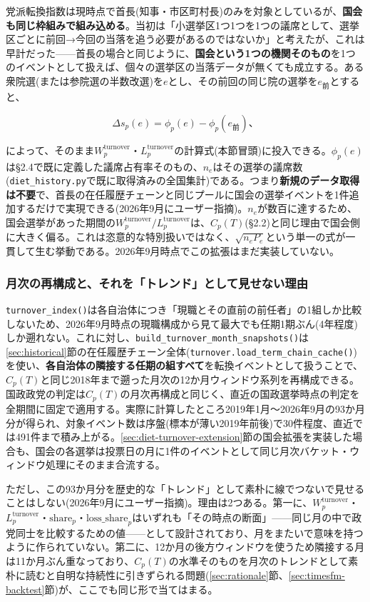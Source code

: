 \documentclass[a4paper,11pt]{ltjsarticle}
\begin{document}
党派転換指数は現時点で首長(知事・市区町村長)のみを対象としているが、\textbf{国会も同じ枠組みで組み込める}。当初は「小選挙区1つ1つを1つの議席として、選挙区ごとに前回→今回の当落を追う必要があるのではないか」と考えたが、これは早計だった——首長の場合と同じように、\textbf{国会という1つの機関そのもの}を1つのイベントとして扱えば、個々の選挙区の当落データが無くても成立する。ある衆院選(または参院選の半数改選)を$e$とし、その前回の同じ院の選挙を$e_{前}$とすると、

\[
\Delta s_p(e) = \phi_p(e) - \phi_p(e_{前})、
\]

によって、そのまま$W_p^{\text{turnover}}$・$L_p^{\text{turnover}}$の計算式(本節冒頭)に投入できる。$\phi_p(e)$は\S2.4で既に定義した議席占有率そのもの、$n_e$はその選挙の議席数(\texttt{diet\_history.py}で既に取得済みの全国集計)である。つまり\textbf{新規のデータ取得は不要}で、首長の在任履歴チェーンと同じプールに国会の選挙イベントを1件追加するだけで実現できる(2026年9月にユーザー指摘)。$n_e$が数百に達するため、国会選挙があった期間の$W_p^{\text{turnover}}/L_p^{\text{turnover}}$は、$C_p(T)$(\S2.2)と同じ理由で国会側に大きく偏る。これは恣意的な特別扱いではなく、$\sqrt{n_eP_e}$という単一の式が一貫して生む挙動である。2026年9月時点でこの拡張はまだ実装していない。

\subsubsection{月次の再構成と、それを「トレンド」として見せない理由}

\texttt{turnover\_index()}は各自治体につき「現職とその直前の前任者」の1組しか比較しないため、2026年9月時点の現職構成から見て最大でも任期1期ぶん(4年程度)しか遡れない。これに対し、\texttt{build\_turnover\_month\_snapshots()}は\ref{sec:historical}節の在任履歴チェーン全体(\texttt{turnover.load\_term\_chain\_cache()})を使い、\textbf{各自治体の隣接する任期の組すべて}を転換イベントとして扱うことで、$C_p(T)$と同じ2018年まで遡った月次の12か月ウィンドウ系列を再構成できる。国政政党の判定は$C_p(T)$の月次再構成と同じく、直近の国政選挙時点の判定を全期間に固定で適用する。実際に計算したところ2019年1月〜2026年9月の93か月分が得られ、対象イベント数は序盤(標本が薄い2019年前後)で30件程度、直近では491件まで積み上がる。\ref{sec:diet-turnover-extension}節の国会拡張を実装した場合も、国会の各選挙は投票日の月に1件のイベントとして同じ月次バケット・ウィンドウ処理にそのまま合流する。

ただし、この93か月分を歴史的な「トレンド」として素朴に線でつないで見せることはしない(2026年9月にユーザー指摘)。理由は2つある。第一に、$W_p^{\text{turnover}}$・$L_p^{\text{turnover}}$・$\text{share}_p$・$\text{loss\_share}_p$はいずれも「その時点の断面」——同じ月の中で政党同士を比較するための値——として設計されており、月をまたいで意味を持つように作られていない。第二に、12か月の後方ウィンドウを使うため隣接する月は11か月ぶん重なっており、$C_p(T)$の水準そのものを月次のトレンドとして素朴に読むと自明な持続性に引きずられる問題(\ref{sec:rationale}節、\ref{sec:timesfm-backtest}節)が、ここでも同じ形で当てはまる。
\end{document}
